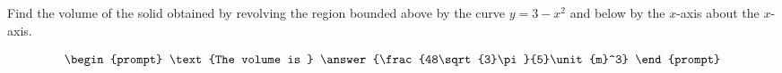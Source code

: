 \documentclass{ximera}
\author{Gregory Hartman \and Matthew Carr}
\begin{document}
\begin{exercise}






Find the volume of the solid obtained by revolving the region bounded above by the curve $y=3-x^2$ and below by the $x$-axis about the $x$-axis.


\[
\begin{prompt}
\text{The volume is } \answer{\frac{48\sqrt{3}\pi}{5}\unit{m}^3}
\end{prompt}
\]




\end{exercise}
\end{document}
